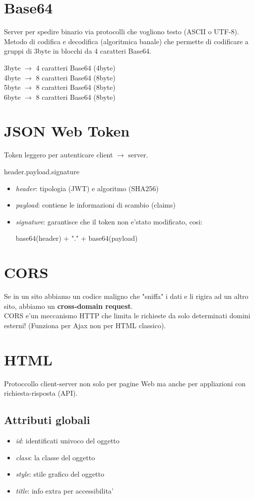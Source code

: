 \documentclass[a4paper,12pt]{article}
\begin{document}
\section{Base64}
Server per spedire binario via protocolli che vogliono testo (ASCII o UTF-8). \\
Metodo di codifica e decodifica (algoritmica banale) che permette di codificare a gruppi di 3byte in blocchi da 4 caratteri Base64.
\begin{center}
    3byte $\to$ 4 caratteri Base64 (4byte) \\
    4byte $\to$ 8 caratteri Base64 (8byte) \\
    5byte $\to$ 8 caratteri Base64 (8byte) \\
    6byte $\to$ 8 caratteri Base64 (8byte) 
\end{center}
\section{JSON Web Token}
Token leggero per autenticare client $\to$ server.
\begin{center}
    header.payload.signature
\end{center}
\begin{itemize}
    \item \textit{header}: tipologia (JWT) e algoritmo (SHA256)
    \item \textit{payload}: contiene le informazioni di scambio (claims)
    \item \textit{signature}: garantisce che il token non e'stato modificato, cosi:
    \begin{center}
        base64(header) + "." + base64(payload)
    \end{center}
\end{itemize}
\section{CORS}
Se in un sito abbiamo un codice maligno che "sniffa" i dati e li rigira ad un altro sito, abbiamo un \textbf{cross‑domain request}. \\
CORS e'un meccanismo HTTP che limita le richieste da solo determinati domini esterni! (Funziona per Ajax non per HTML classico).
\section{HTML}
Protoccollo client-server non solo per pagine Web ma anche per appliazioni con richiesta-risposta (API).
\subsection{Attributi globali}
\begin{itemize}
    \item \textit{id}: identificati univoco del oggetto
    \item \textit{class}: la classe del oggetto
    \item \textit{style}: stile grafico del oggetto
    \item \textit{title}: info extra per accessibilita'
\end{itemize}
\end{document}
